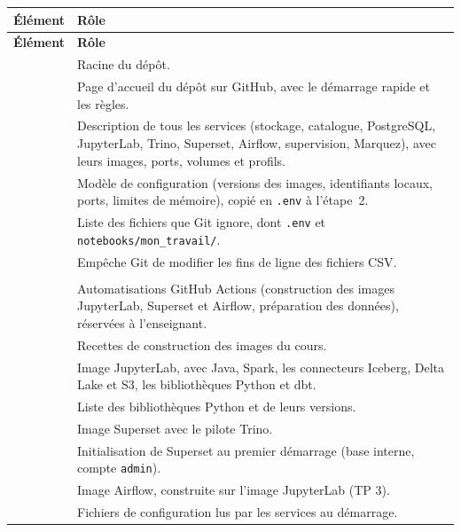 \documentclass[11pt,a4paper]{article}
\newcommand{\cmd}[1]{\texttt{#1}}
\begin{document}
{\small
\renewcommand{\arraystretch}{1.2}
\begin{xltabular}{\textwidth}{@{}>{\raggedright\arraybackslash}p{5.6cm} >{\raggedright\arraybackslash}X@{}}
\toprule
\textbf{Élément} & \textbf{Rôle} \\
\midrule
\endfirsthead
\toprule
\textbf{Élément} & \textbf{Rôle} \\
\midrule
\endhead
\bottomrule
\endfoot
{} & Racine du dépôt. \\
 & Page d'accueil du dépôt sur GitHub, avec le démarrage rapide et les règles. \\
 & Description de tous les services (stockage, catalogue, PostgreSQL,
  JupyterLab, Trino, Superset, Airflow, supervision, Marquez), avec leurs images, ports, volumes et profils. \\
 & Modèle de configuration (versions des images, identifiants locaux, ports,
  limites de mémoire), copié en \cmd{.env} à l'étape~2. \\
 & Liste des fichiers que Git ignore, dont \cmd{.env} et \cmd{notebooks/mon\_travail/}. \\
 & Empêche Git de modifier les fins de ligne des fichiers CSV. \\
\addlinespace
{} & \\*
 & Automatisations GitHub Actions (construction des images JupyterLab, Superset et
  Airflow, préparation des données), réservées à l'enseignant. \\
\addlinespace
{} & Recettes de construction des images du cours. \\*
 & Image JupyterLab, avec Java, Spark, les connecteurs Iceberg, Delta Lake
  et S3, les bibliothèques Python et dbt. \\
 & Liste des bibliothèques Python et de leurs versions. \\
 & Image Superset avec le pilote Trino. \\
 & Initialisation de Superset au premier démarrage
  (base interne, compte \texttt{admin}). \\
 & Image Airflow, construite sur l'image JupyterLab (TP 3). \\
\addlinespace
{} & Fichiers de configuration lus par les services au démarrage. \\*

\end{xltabular}}
\end{document}
